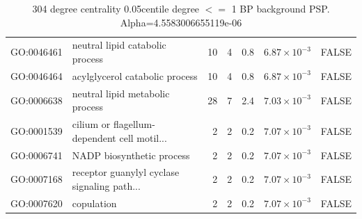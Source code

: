 \begin{table}[ht]
\begin{adjustbox}{max width=\textwidth}
\begin{tabular}{llrrrrl}
  GO:0046461 & neutral lipid catabolic process & 10 & 4 & 0.8 & $6.87 \times 10^{-3}$ & FALSE \\ 
  GO:0046464 & acylglycerol catabolic process & 10 & 4 & 0.8 & $6.87 \times 10^{-3}$ & FALSE \\ 
  GO:0006638 & neutral lipid metabolic process & 28 & 7 & 2.4 & $7.03 \times 10^{-3}$ & FALSE \\ 
  GO:0001539 & cilium or flagellum-dependent cell motil... & 2 & 2 & 0.2 & $7.07 \times 10^{-3}$ & FALSE \\ 
  GO:0006741 & NADP biosynthetic process & 2 & 2 & 0.2 & $7.07 \times 10^{-3}$ & FALSE \\ 
  GO:0007168 & receptor guanylyl cyclase signaling path... & 2 & 2 & 0.2 & $7.07 \times 10^{-3}$ & FALSE \\ 
  GO:0007620 & copulation & 2 & 2 & 0.2 & $7.07 \times 10^{-3}$ & FALSE \\ 
   \hline
\end{tabular}
\end{adjustbox}
\caption{304 degree centrality 0.05centile degree $<=$ 1 BP background PSP. Alpha=4.5583006655119e-06} 
\label{tab:304 degree centrality 0.05centile  1 BP background PSP. Alpha=4.5583006655119e-06}
\end{table}



